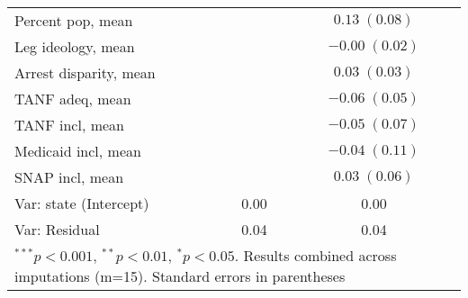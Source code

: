 \begin{table}
\begin{center}
\begin{tabular}{l c c }
Percent pop, mean          &                        & $0.13 \; (0.08)$       \\
Leg ideology, mean         &                        & $-0.00 \; (0.02)$      \\
Arrest disparity, mean     &                        & $0.03 \; (0.03)$       \\
TANF adeq, mean            &                        & $-0.06 \; (0.05)$      \\
TANF incl, mean            &                        & $-0.05 \; (0.07)$      \\
Medicaid incl, mean        &                        & $-0.04 \; (0.11)$      \\
SNAP incl, mean            &                        & $0.03 \; (0.06)$       \\
\hline
Var: state (Intercept)     & 0.00                   & 0.00                   \\
Var: Residual              & 0.04                   & 0.04                   \\
\hline
\multicolumn{3}{l}{\scriptsize{$^{***}p<0.001$, $^{**}p<0.01$, $^*p<0.05$. Results combined across imputations (m=15). Standard errors in parentheses}}
\end{tabular}
\label{table:coefficients}
\end{center}
\end{table}
